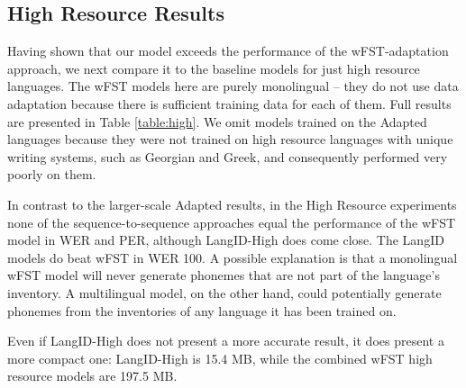 \documentclass[11pt,letterpaper]{article}
\begin{document}
\begin{table}[h]
\caption{Adapted Results}
\label{table:adapted}
\end{table}

\subsection{High Resource Results}
Having shown that our model exceeds the performance of the wFST-adaptation approach, we next compare it to the baseline models for just high resource languages. The wFST models here are purely monolingual -- they do not use data adaptation because there is sufficient training data for each of them. Full results are presented in Table \ref{table:high}. We omit models trained on the Adapted languages because they were not trained on high resource languages with unique writing systems, such as Georgian and Greek, and consequently performed very poorly on them.

In contrast to the larger-scale Adapted results, in the High Resource experiments none of the sequence-to-sequence approaches equal the performance of the wFST model in WER and PER, although LangID-High does come close. The LangID models do beat wFST in WER 100. A possible explanation is that a monolingual wFST model will never generate phonemes that are not part of the language's inventory. A multilingual model, on the other hand, could potentially generate phonemes from the inventories of any language it has been trained on.

Even if LangID-High does not present a more accurate result, it does present a more compact one: LangID-High is 15.4 MB, while the combined wFST high resource models are 197.5 MB.
\end{document}
